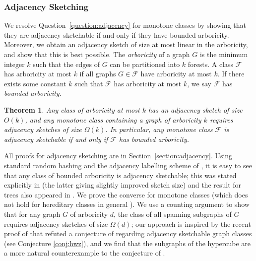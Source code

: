 \documentclass[11pt]{article}
\newtheorem{thm}{Theorem}[section]
\theoremstyle{definition}
\def\F {{\mathcal F}}
\begin{document}
\subsubsection{Adjacency Sketching}
We resolve Question~\ref{question:adjacency} for monotone classes by showing that they are adjacency
sketchable if and only if they have bounded arboricity. Moreover, we obtain
an adjacency sketch of size at most linear in the
arboricity, and show that this is best possible. The \emph{arboricity}
of a graph $G$ is the minimum integer $k$ such that the edges of $G$ 
can be partitioned into $k$ forests. A class $\F$ has arboricity at
most $k$ if all graphs $G \in \F$ have
arboricity at most $k$. If there exists some constant $k$ such that
$\F$ has arboricity at most $k$, we say
$\F$ has \emph{bounded arboricity}.
\begin{thm}
\label{thm:intro adjacency}
Any class of arboricity at most $k$ has an adjacency sketch of size
$O(k)$, and any monotone class containing a graph of arboricity $k$
requires adjacency sketches of size $\Omega(k)$. In particular, any
monotone class $\F$ is adjacency sketchable if and
only if $\F$ has bounded arboricity.
\end{thm}
\noindent
All proofs for adjacency sketching are in Section~\ref{section:adjacency}.  Using standard random
hashing and the adjacency labelling scheme of \cite{KNR92}, it is easy to see that any class of
bounded arboricity is adjacency sketchable; this was stated explicitly in \cite{Har20,HWZ21} (the
latter giving slightly improved sketch size) and the result for trees also appeared in \cite{FK09}.
We prove the converse for monotone classes (which does not hold for hereditary classes in general
\cite{HWZ21}).
We use a counting argument to show that for any graph $G$ of
arboricity $d$,  the class of all spanning
subgraphs of $G$ requires adjacency sketches of
size $\Omega(d)$; our approach is inspired by the recent proof of \cite{HHH21a,HHH21b} that refuted a
conjecture of \cite{HWZ21} regarding adjacency sketchable graph classes (see Conjecture
\ref{conj:hwz}), and we find that the subgraphs of the hypercube are a more natural counterexample
to the conjecture of \cite{HWZ21}.
\end{document}
